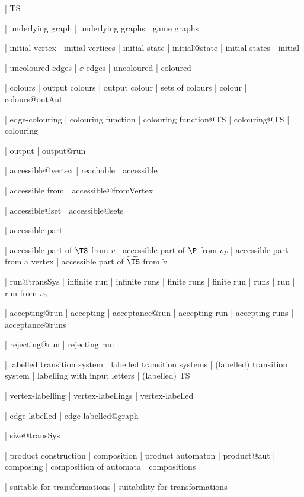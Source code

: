  | TS


| underlying graph
| underlying graphs
| game graphs

| initial vertex
| initial vertices
| initial state
| initial@state
| initial states
| initial

  | uncoloured edges
  | $\ee $-edges
  | uncoloured
  | coloured

  
  | colours
  | output colours
  | output colour
  | sets of colours
  | colour
  | colours@outAut
  

 | edge-colouring 
 | colouring function
 | colouring function@TS
 | colouring@TS
 | colouring

| output
| output@run


 | accessible@vertex
 | reachable
 | accessible
 
 | accessible from
 | accessible@fromVertex

 | accessible@set
 | accessible@sets

| accessible part

| accessible part of $\TS $ from $v$
| accessible part of $\P $ from $v_P$
| accessible part from a vertex
| accessible part of $\widetilde {\TS }$ from $\tilde {v}$


| run@transSys
| infinite run
| infinite runs
| finite runs
| finite run
| runs
| run
| run from $v_0$
  

| accepting@run
| accepting
| acceptance@run
| accepting run
| accepting runs
| acceptance@runs


| rejecting@run
| rejecting run

| labelled transition system
| labelled transition systems
| (labelled) transition system
| labelling with input letters
| (labelled) TS


| vertex-labelling
| vertex-labellings
| vertex-labelled

| edge-labelled
| edge-labelled@graph


| size@transSys

  | product construction
  | composition
  | product automaton
  | product@aut
  | composing
  | composition of automata
  | compositions
  
  | suitable for transformations
  | suitability for transformations


